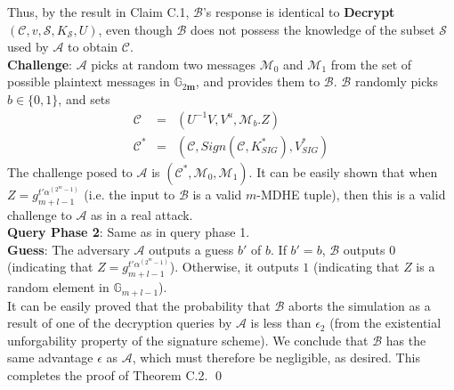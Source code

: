 \noindent Thus, by the result in Claim C.1, $\mathcal{B}$'s response is identical to \textbf{Decrypt}$(\mathcal{C},v,\mathcal{S},K_{\mathcal{S}},U)$, even though $\mathcal{B}$ does not possess the knowledge of the subset $\mathcal{S}$ used by $\mathcal{A}$ to obtain $\mathcal{C}$.\\
 
\noindent \textbf{Challenge}: $\mathcal{A}$ picks at random two messages $\mathcal{M}_0$ and $\mathcal{M}_1$ from the set of possible plaintext messages in $\mathbb{G}_{2\mathbf{m}}$, and provides them to $\mathcal{B}$. $\mathcal{B}$ randomly picks $b\in\{0,1\}$, and sets 
\begin{eqnarray}
 \mathcal{C}&=&(U^{-1}V,V^u,\mathcal{M}_b.Z) \nonumber\\
 \mathcal{C}^{*}&=&(\mathcal{C},Sign(\mathcal{C},K^{*}_{SIG}),V^{*}_{SIG})\nonumber
\end{eqnarray}
\noindent The challenge posed to $\mathcal{A}$ is $(\mathcal{C}^{*},\mathcal{M}_0,\mathcal{M}_1)$. It can be easily shown that when $Z=g^{t'\alpha^{(2^m-1)}}_{m+l-1}$ (i.e. the input to $\mathcal{B}$ is a valid $m$-MDHE tuple), then this is a valid challenge to $\mathcal{A}$ as in a real attack.\\

\noindent\textbf{Query Phase 2}: Same as in query phase 1.\\
 
\noindent \textbf{Guess}: The adversary $\mathcal{A}$ outputs a guess $b'$ of $b$. If $b' = b$, $\mathcal{B}$ outputs $0$ (indicating that $Z=g^{t'\alpha^{(2^m-1)}}_{m+l-1}$). Otherwise, it outputs $1$ (indicating that $Z$ is a random element in $\mathbb{G}_{m+l-1}$).\\

\noindent It can be easily proved that the probability that $\mathcal{B}$ aborts the simulation as a result of one of the decryption queries by $\mathcal{A}$ is less than $\epsilon_2$ (from the existential unforgability property of the signature scheme). We conclude that $\mathcal{B}$ has the same advantage $\epsilon$ as $\mathcal{A}$, which must therefore be negligible, as desired. This completes the proof of Theorem C.2. \hfill\qed
